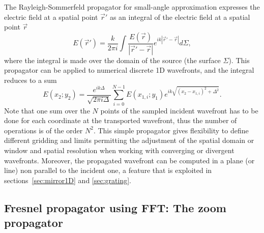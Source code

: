 \documentclass{iopconfser}
\begin{document}
The Rayleigh-Sommerfeld propagator for small-angle approximation expresses the electric field at a spatial point $\vec{r}'$ as an integral of the electric field at a spatial point $\vec{r}$ \cite{goodmanfourier}
\begin{equation}\label{eq:RSpropagator}
E(\vec{r}') =  \frac{k}{2 \pi i} \int \frac{E(\vec{r})}{|\vec{r}'-\vec{r}|} e^{ i k |\vec{r}' - \vec{r}|  }  d\Sigma,
\end{equation}
where the integral is made over the domain of the source (the surface $\Sigma$). 
This propagator can be applied to numerical discrete 1D wavefronts, and the integral reduces to a sum
\begin{equation}\label{eq:discreteRSpropagator}
E(x_2;y_2) = \frac{e^{i k \Delta}}{\sqrt{2 \pi i \Delta}}  \sum_{i=0}^{N-1}  E(x_{1,i};y_1) e^{i k \sqrt{(x_2 - x_{1,i})^2 + \Delta^2} }.
\end{equation}
Note that one sum over the $N$ points of the sampled incident wavefront has to be done for each coordinate at the transported wavefront, thus the number of operations is of the order $N^2$. This simple propagator gives flexibility to define different gridding and limits permitting the adjustment of the spatial domain or window and spatial resolution when working with converging or divergent wavefronts. Moreover, the propagated wavefront can be computed in a plane (or line) non parallel to the incident one, a feature that is exploited in sections~\ref{sec:mirror1D} and \ref{sec:grating}. 


\subsection{Fresnel propagator using FFT: The zoom propagator}
\label{sec:zoomPropagator}
\end{document}
